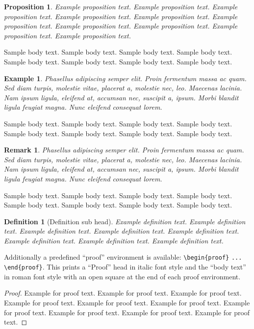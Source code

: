 \documentclass[sn-mathphys]{sn-jnl}%
\theoremstyle{thmstyleone}%
\newtheorem{proposition}[theorem]{Proposition}%
\theoremstyle{thmstyletwo}%
\newtheorem{example}{Example}%
\newtheorem{remark}{Remark}%
\theoremstyle{thmstylethree}%
\newtheorem{definition}{Definition}%
\begin{document}
\begin{proposition}
Example proposition text. Example proposition text. Example proposition text. Example proposition text. Example proposition text. 
Example proposition text. Example proposition text. Example proposition text. Example proposition text. Example proposition text. 
\end{proposition}

Sample body text. Sample body text. Sample body text. Sample body text. Sample body text. Sample body text. Sample body text. Sample body text.

\begin{example}
Phasellus adipiscing semper elit. Proin fermentum massa
ac quam. Sed diam turpis, molestie vitae, placerat a, molestie nec, leo. Maecenas lacinia. Nam ipsum ligula, eleifend
at, accumsan nec, suscipit a, ipsum. Morbi blandit ligula feugiat magna. Nunc eleifend consequat lorem. 
\end{example}

Sample body text. Sample body text. Sample body text. Sample body text. Sample body text. Sample body text. Sample body text. Sample body text.

\begin{remark}
Phasellus adipiscing semper elit. Proin fermentum massa
ac quam. Sed diam turpis, molestie vitae, placerat a, molestie nec, leo. Maecenas lacinia. Nam ipsum ligula, eleifend
at, accumsan nec, suscipit a, ipsum. Morbi blandit ligula feugiat magna. Nunc eleifend consequat lorem. 
\end{remark}

Sample body text. Sample body text. Sample body text. Sample body text. Sample body text. Sample body text. Sample body text. Sample body text.

\begin{definition}[Definition sub head]
Example definition text. Example definition text. Example definition text. Example definition text. Example definition text. Example definition text. Example definition text. Example definition text. 
\end{definition}

Additionally a predefined ``proof'' environment is available: \verb+\begin{proof}+ \verb+...+ \verb+\end{proof}+. This prints a ``Proof'' head in italic font style and the ``body text'' in roman font style with an open square at the end of each proof environment. 

\begin{proof}
Example for proof text. Example for proof text. Example for proof text. Example for proof text. Example for proof text. Example for proof text. Example for proof text. Example for proof text. Example for proof text. Example for proof text. 
\end{proof}
\end{document}
